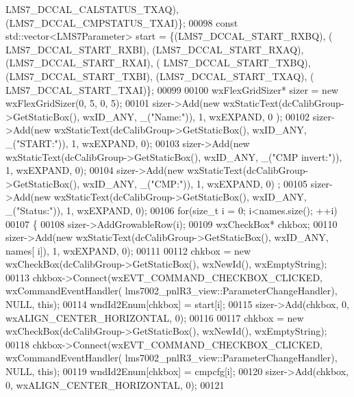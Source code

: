 \begin{DoxyCode}
      LMS7_DCCAL_CALSTATUS_TXAQ), (LMS7_DCCAL_CMPSTATUS_TXAI)\};
00098             \textcolor{keyword}{const} std::vector<LMS7Parameter> start = \{(LMS7_DCCAL_START_RXBQ), (
      LMS7_DCCAL_START_RXBI), (LMS7_DCCAL_START_RXAQ), (LMS7_DCCAL_START_RXAI), (
      LMS7_DCCAL_START_TXBQ), (LMS7_DCCAL_START_TXBI), (LMS7_DCCAL_START_TXAQ), (
      LMS7_DCCAL_START_TXAI)\};
00099 
00100             wxFlexGridSizer* sizer = \textcolor{keyword}{new} wxFlexGridSizer(0, 5, 0, 5);
00101             sizer->Add(\textcolor{keyword}{new} wxStaticText(dcCalibGroup->GetStaticBox(), wxID\_ANY, \_(\textcolor{stringliteral}{"Name:"})), 1, wxEXPAND, 0
      );
00102             sizer->Add(\textcolor{keyword}{new} wxStaticText(dcCalibGroup->GetStaticBox(), wxID\_ANY, \_(\textcolor{stringliteral}{"START:"})), 1, wxEXPAND, 
      0);
00103             sizer->Add(\textcolor{keyword}{new} wxStaticText(dcCalibGroup->GetStaticBox(), wxID\_ANY, \_(\textcolor{stringliteral}{"CMP invert:"})), 1, 
      wxEXPAND, 0);
00104             sizer->Add(\textcolor{keyword}{new} wxStaticText(dcCalibGroup->GetStaticBox(), wxID\_ANY, \_(\textcolor{stringliteral}{"CMP:"})), 1, wxEXPAND, 0)
      ;
00105             sizer->Add(\textcolor{keyword}{new} wxStaticText(dcCalibGroup->GetStaticBox(), wxID\_ANY, \_(\textcolor{stringliteral}{"Status:"})), 1, wxEXPAND,
       0);
00106             \textcolor{keywordflow}{for}(\textcolor{keywordtype}{size\_t} i = 0; i<names.size(); ++i)
00107             \{
00108                 sizer->AddGrowableRow(i);
00109                 wxCheckBox* chkbox;
00110                 sizer->Add(\textcolor{keyword}{new} wxStaticText(dcCalibGroup->GetStaticBox(), wxID\_ANY, names[
      i]), 1, wxEXPAND, 0);
00111 
00112                 chkbox = \textcolor{keyword}{new} wxCheckBox(dcCalibGroup->GetStaticBox(), wxNewId(), wxEmptyString);
00113                 chkbox->Connect(wxEVT\_COMMAND\_CHECKBOX\_CLICKED, wxCommandEventHandler(
      lms7002_pnlR3_view::ParameterChangeHandler), NULL, \textcolor{keyword}{this});
00114                 wndId2Enum[chkbox] = start[i];
00115                 sizer->Add(chkbox, 0, wxALIGN\_CENTER\_HORIZONTAL, 0);
00116 
00117                 chkbox = \textcolor{keyword}{new} wxCheckBox(dcCalibGroup->GetStaticBox(), wxNewId(), wxEmptyString);
00118                 chkbox->Connect(wxEVT\_COMMAND\_CHECKBOX\_CLICKED, wxCommandEventHandler(
      lms7002_pnlR3_view::ParameterChangeHandler), NULL, \textcolor{keyword}{this});
00119                 wndId2Enum[chkbox] = cmpcfg[i];
00120                 sizer->Add(chkbox, 0, wxALIGN\_CENTER\_HORIZONTAL, 0);
00121 

\end{DoxyCode}
